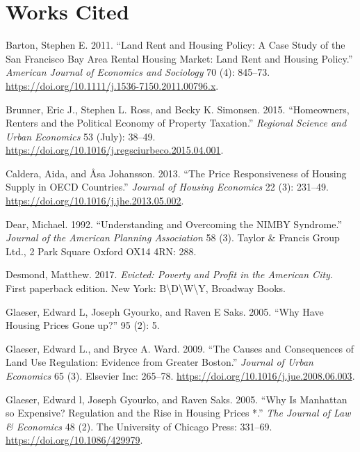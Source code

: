 \documentclass[]{article}
\begin{document}
\hypertarget{works-cited}{%
\section*{Works Cited}\label{works-cited}}

\hypertarget{refs}{}
\leavevmode\hypertarget{ref-bartonLandRentHousing2011}{}%
Barton, Stephen E. 2011. ``Land Rent and Housing Policy: A Case Study of the San Francisco Bay Area Rental Housing Market: Land Rent and Housing Policy.'' \emph{American Journal of Economics and Sociology} 70 (4): 845--73. \url{https://doi.org/10.1111/j.1536-7150.2011.00796.x}.

\leavevmode\hypertarget{ref-brunnerHomeownersRentersPolitical2015}{}%
Brunner, Eric J., Stephen L. Ross, and Becky K. Simonsen. 2015. ``Homeowners, Renters and the Political Economy of Property Taxation.'' \emph{Regional Science and Urban Economics} 53 (July): 38--49. \url{https://doi.org/10.1016/j.regsciurbeco.2015.04.001}.

\leavevmode\hypertarget{ref-calderaPriceResponsivenessHousing2013}{}%
Caldera, Aida, and Åsa Johansson. 2013. ``The Price Responsiveness of Housing Supply in OECD Countries.'' \emph{Journal of Housing Economics} 22 (3): 231--49. \url{https://doi.org/10.1016/j.jhe.2013.05.002}.

\leavevmode\hypertarget{ref-dearUnderstandingOvercomingNIMBY1992}{}%
Dear, Michael. 1992. ``Understanding and Overcoming the NIMBY Syndrome.'' \emph{Journal of the American Planning Association} 58 (3). Taylor \& Francis Group Ltd., 2 Park Square Oxford OX14 4RN: 288.

\leavevmode\hypertarget{ref-desmondEvictedPovertyProfit2017}{}%
Desmond, Matthew. 2017. \emph{Evicted: Poverty and Profit in the American City}. First paperback edition. New York: B\textbackslash{}D\textbackslash{}W\textbackslash{}Y, Broadway Books.

\leavevmode\hypertarget{ref-glaeserWhyHaveHousing2005}{}%
Glaeser, Edward L, Joseph Gyourko, and Raven E Saks. 2005. ``Why Have Housing Prices Gone up?'' 95 (2): 5.

\leavevmode\hypertarget{ref-glaeserCausesConsequencesLand2009}{}%
Glaeser, Edward L., and Bryce A. Ward. 2009. ``The Causes and Consequences of Land Use Regulation: Evidence from Greater Boston.'' \emph{Journal of Urban Economics} 65 (3). Elsevier Inc: 265--78. \url{https://doi.org/10.1016/j.jue.2008.06.003}.

\leavevmode\hypertarget{ref-glaeserWhyManhattanExpensive2005}{}%
Glaeser, Edward l, Joseph Gyourko, and Raven Saks. 2005. ``Why Is Manhattan so Expensive? Regulation and the Rise in Housing Prices *.'' \emph{The Journal of Law \& Economics} 48 (2). The University of Chicago Press: 331--69. \url{https://doi.org/10.1086/429979}.
\end{document}
